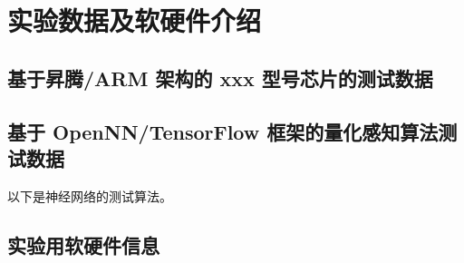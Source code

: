 \section{实验数据及软硬件介绍}


\subsection{基于昇腾/ARM 架构的 xxx 型号芯片的测试数据}


\subsection{基于 OpenNN/TensorFlow 框架的量化感知算法测试数据}

以下是神经网络的测试算法。

\subsection{实验用软硬件信息}